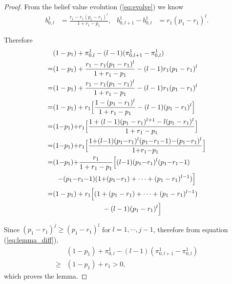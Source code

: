 \documentclass[11pt,twocolumn]{IEEEtran}
\begin{document}
\begin{proof}
From the belief value evolution (\ref{eq:evolve}) we know
\begin{align}
b^1_{0,l}&=\frac{r_1-r_1(p_1-r_1)^l}{1+r_1-p_1}, & b^1_{0,l+1}-b^1_{0,l}&=r_1(p_1-r_1)^l. \nonumber
\end{align}

Therefore
\begin{align}
&(1-p_1)+\pi^1_{0,l} - (l-1)(\pi^1_{0,l+1}-\pi^1_{0,l})\nonumber \\
=&(1-p_1)+\frac{r_1-r_1(p_1-r_1)^{l}}{1+r_1-p_1} - (l-1)r_1(p_1-r_1)^{l} \nonumber \\
=&(1-p_1)+\frac{r_1-r_1(p_1-r_1)^{l}}{1+r_1-p_1} - (l-1)r_1(p_1-r_1)^{l} \nonumber \\
=&(1-p_1)+r_1\Big[ \frac{1-(p_1-r_1)^{l}}{1+r_1-p_1} - (l-1)(p_1-r_1)^{l} \Big] \nonumber \\
=&(1{-}p_1){+}r_1\Big[ \frac{1+(l-1)(p_1-r_1)^{l+1}-l(p_1-r_1)^{l}}{1+r_1-p_1} \Big] \nonumber\\
=&(1{-}p_1){+}r_1\Big[ \frac{1{+}(l{-}1)(p_1{-}r_1)^{l}(p_1{-}r_1{-}1){-}(p_1{-}r_1)^{l}}{1{+}r_1{-}p_1} \Big] \nonumber \\
=&(1{-}p_1){+}\frac{r_1}{1+r_1-p_1}\Big[ (l{-}1)(p_1{-}r_1)^{l}(p_1{-}r_1{-}1)\nonumber\\
&\hspace{0.1in}{-}(p_1{-}r_1{-}1)(1{+}(p_1{-}r_1)+\cdots+(p_1-r_1)^{l-1}) \Big] \nonumber \\
=&(1-p_1)+r_1\Big[ (1+(p_1-r_1)+\cdots+(p_1-r_1)^{l-1})\nonumber\\
&\hspace{1in}-(l-1)(p_1-r_1)^{l} \Big]
 \label{eq:lemma_diff}
\end{align}

Since $(p_1-r_1)^j \geq (p_1-r_1)^{l}$ for $l = 1, \cdots, j-1$, therefore from equation (\ref{eq:lemma_diff}),
\begin{align}
&(1-p_1)+\pi^1_{0,l} - (l-1)(\pi^1_{0,l+1}-\pi^1_{0,l})\nonumber\\
\geq& (1-p_1)+r_1 > 0, \nonumber
\end{align}
which proves the lemma.
\end{proof}
\end{document}
